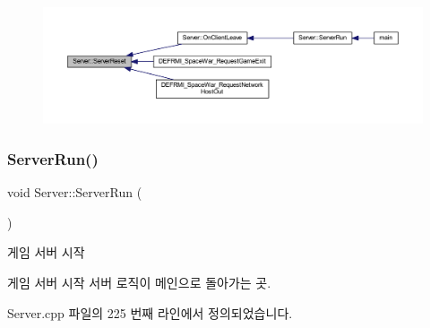 \begin{figure}[H]
\begin{center}
\leavevmode
\includegraphics[width=350pt]{class_server_a88d53d3c77d90f211f3ca7cc51735171_icgraph}
\end{center}
\end{figure}
\mbox{\label{class_server_acb327f7980ef16c40087bdafcef5ad7a}} 
\subsubsection{\texorpdfstring{Server\+Run()}{ServerRun()}}
{\footnotesize\ttfamily void Server\+::\+Server\+Run (\begin{DoxyParamCaption}{ }\end{DoxyParamCaption})}



게임 서버 시작 

게임 서버 시작  서버 로직이 메인으로 돌아가는 곳. 

Server.\+cpp 파일의 225 번째 라인에서 정의되었습니다.


